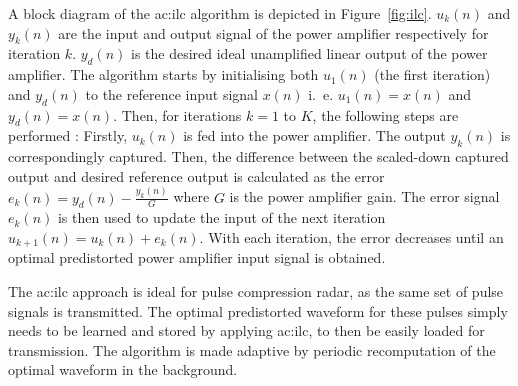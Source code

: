 A block diagram of the \gls{ac:ilc} algorithm is depicted in Figure~\ref{fig:ilc}. $u_k(n)$ and $y_k(n)$ are the input and output signal of the power amplifier respectively for iteration $k$. $y_d(n)$ is the desired ideal unamplified linear output of the power amplifier. The algorithm starts by initialising both $u_1(n)$ (the first iteration) and $y_d(n)$ to the reference input signal $x(n)$ i.~e. $u_1(n) = x(n)$ and $y_d(n) = x(n)$. Then, for iterations $k = 1$ to $K$, the following steps are performed \cite{chanicahuana}: Firstly, $u_k(n)$ is fed into the power amplifier. The output $y_k(n)$ is correspondingly captured. Then, the difference between the scaled-down captured output and desired reference output is calculated as the error $e_k(n) = y_d(n) - \frac{y_k(n)}{G}$ where $G$ is the power amplifier gain. The error signal $e_k(n)$ is then used to update the input of the next iteration $u_{k+1}(n) = u_k(n) + e_k(n)$. With each iteration, the error decreases until an optimal predistorted power amplifier input signal is obtained. 

The \gls{ac:ilc} approach is ideal for pulse compression radar, as the same set of pulse signals is transmitted. The optimal predistorted waveform for these pulses simply needs to be learned and stored by applying \gls{ac:ilc}, to then be easily loaded for transmission. The algorithm is made adaptive by periodic recomputation of the optimal waveform in the background.


